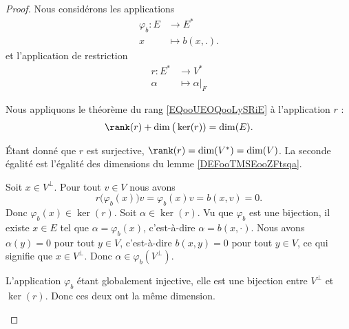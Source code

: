 \begin{proof}
	Nous considérons les applications
	\begin{equation}
		\begin{aligned}
			\varphi_b\colon E & \to E^*         \\
			x                 & \mapsto b(x,.).
		\end{aligned}
	\end{equation}
	et l'application de restriction
	\begin{equation}
		\begin{aligned}
			r\colon E^* & \to V^*           \\
			\alpha      & \mapsto \alpha|_F
		\end{aligned}
	\end{equation}

	\begin{subproof}
		Nous appliquons le théorème du rang \ref{EQooUEOQooLySRiE} à l'application \( r\) :
		\begin{equation}		\label{EQooSABBooUdWyZL}
			\rank(r)+\dim\big(\ker(r))=\dim(E).
		\end{equation}

		\spitem[\( \rank(r)=\dim(V)\)]

		Étant donné que \( r\) est surjective, \(\rank(r)=\dim(V^*)=\dim(V)\). La seconde égalité est l'égalité des dimensions du lemme \ref{DEFooTMSEooZFtsqa}.

		Soit \( x\in V^{\perp}\). Pour tout \( v\in V\) nous avons
		\begin{equation}
			r\big(\varphi_b(x))v=\varphi_b(x)v=b(x,v)=0.
		\end{equation}
		Donc \( \varphi_b(x)\in\ker(r)\).
		Soit \( \alpha\in \ker(r)\). Vu que \( \varphi_b\) est une bijection, il existe \( x\in E\) tel que \( \alpha=\varphi_b(x)\), c'est-à-dire \( \alpha=b(x,\cdot)\). Nous avons \( \alpha(y)=0\) pour tout \( y\in V\), c'est-à-dire \( b(x,y)=0\) pour tout \( y\in V\), ce qui signifie que \( x\in V^{\perp}\). Donc \( \alpha\in \varphi_b(V^{\perp})\).

		\spitem[\( \dim(V^{\perp})=\dim\big(\ker(r)\big)\)]
		L'application \( \varphi_b\) étant globalement injective, elle est une bijection entre \( V^{\perp}\) et \( \ker(r)\). Donc ces deux ont la même dimension.


\end{subproof}
\end{proof}
